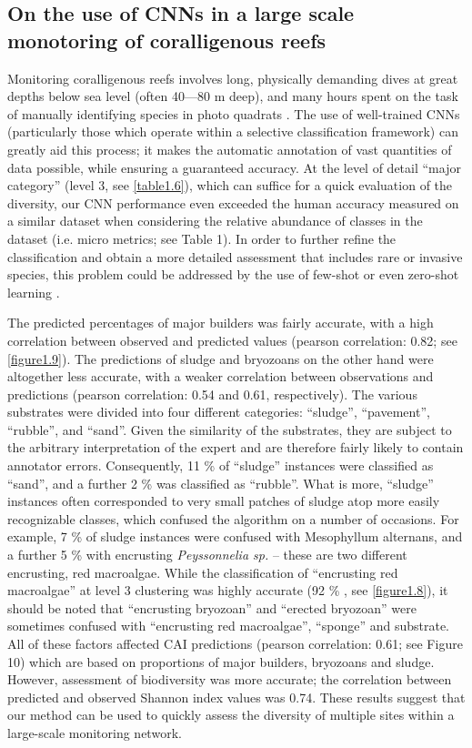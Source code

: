 \subsection{On the use of CNNs in a large scale monotoring of coralligenous reefs}\label{chapitre1_7.4}
Monitoring coralligenous reefs involves long, physically demanding dives at great depths below sea level (often 40---80 m deep), and many hours spent on the task of manually identifying species in photo quadrats \citep{deter_rapid_2012}. The use of well-trained CNNs (particularly those which operate within a selective classification framework) can greatly aid this process; it makes the automatic annotation of vast quantities of data possible, while ensuring a guaranteed accuracy. At the level of detail “major category” (level 3, see \autoref{table1.6}), which can suffice for a quick evaluation of the diversity, our CNN performance even exceeded the human accuracy measured on a similar dataset when considering the relative abundance of classes in the dataset (i.e. micro metrics; see Table 1). In order to further refine the classification and obtain a more detailed assessment that includes rare or invasive species, this problem could be addressed by the use of few-shot or even zero-shot learning \citep{liu_generalized_2018}.

The predicted percentages of major builders was fairly accurate, with a high correlation between observed and predicted values (pearson correlation: 0.82; see \autoref{figure1.9}). The predictions of sludge and bryozoans on the other hand were altogether less accurate, with a weaker correlation between observations and predictions (pearson correlation: 0.54 and 0.61, respectively). The various substrates were divided into four different categories: “sludge”, “pavement”, “rubble”, and “sand”. Given the similarity of the substrates, they are subject to the arbitrary interpretation of the expert and are therefore fairly likely to contain annotator errors. Consequently, 11 \% of “sludge” instances were classified as “sand”, and a further 2 \% was classified as “rubble”. What is more, “sludge” instances often corresponded to very small patches of sludge atop more easily recognizable classes, which confused the algorithm on a number of occasions. For example, 7 \% of sludge instances were confused with Mesophyllum alternans, and a further 5 \% with encrusting \textit{Peyssonnelia sp.} – these are two different encrusting, red macroalgae. While the classification of “encrusting red macroalgae” at level 3 clustering was highly accurate (92 \% , see \autoref{figure1.8}), it should be noted that “encrusting bryozoan” and “erected bryozoan” were sometimes confused with “encrusting red macroalgae”, “sponge” and substrate. All of these factors affected CAI predictions (pearson correlation: 0.61; see Figure 10) which are based on proportions of major builders, bryozoans and sludge. However, assessment of biodiversity was more accurate; the correlation between predicted and observed Shannon index values was 0.74. These results suggest that our method can be used to quickly assess the diversity of multiple sites within a large-scale monitoring network.

